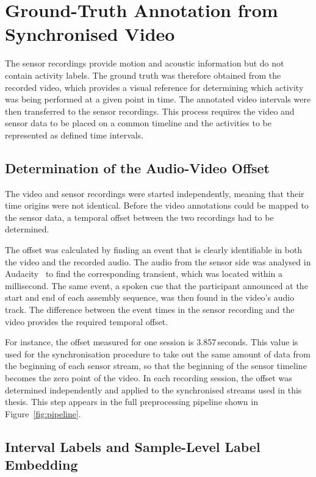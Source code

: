 \section{Ground-Truth Annotation from Synchronised Video}
\label{sec:annotation}

The sensor recordings provide motion and acoustic information but do not contain
activity labels. The ground truth was therefore obtained from the recorded
video, which provides a visual reference for determining which activity was
being performed at a given point in time. The annotated video intervals were
then transferred to the sensor recordings. This process requires the video and
sensor data to be placed on a common timeline and the activities to be
represented as defined time intervals.

\subsection{Determination of the Audio-Video Offset}
\label{sec:offset}

The video and sensor recordings were started independently, meaning that their
time origins were not identical. Before the video annotations could be mapped
to the sensor data, a temporal offset between the two recordings had to be
determined.

The offset was calculated by finding an event that is clearly identifiable in
both the video and the recorded audio. The audio from the sensor side was
analysed in Audacity~\cite{audacity} to find the corresponding transient, which
was located within a millisecond. The same event, a spoken cue that the
participant announced at the start and end of each assembly sequence, was then
found in the video's audio track. The difference between the event times in the
sensor recording and the video provides the required temporal offset.

For instance, the offset measured for one session is 3.857\,seconds. This value
is used for the synchronisation procedure to take out the same amount of data
from the beginning of each sensor stream, so that the beginning of the sensor
timeline becomes the zero point of the video. In each recording session, the
offset was determined independently and applied to the synchronised streams used
in this thesis. This step appears in the full preprocessing pipeline shown in
Figure~\ref{fig:pipeline}.

\subsection{Interval Labels and Sample-Level Label Embedding}
\label{sec:labels}

